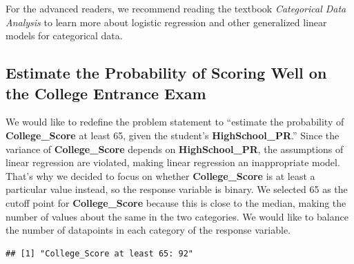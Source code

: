 \documentclass[
]{article}
\newenvironment{Shaded}{\begin{snugshade}}{\end{snugshade}}
\newcommand{\DecValTok}[1]{\textcolor[rgb]{0.00,0.00,0.81}{#1}}
\newcommand{\FunctionTok}[1]{\textcolor[rgb]{0.00,0.00,0.00}{#1}}
\newcommand{\NormalTok}[1]{#1}
\newcommand{\SpecialCharTok}[1]{\textcolor[rgb]{0.00,0.00,0.00}{#1}}
\newcommand{\StringTok}[1]{\textcolor[rgb]{0.31,0.60,0.02}{#1}}
\begin{document}
For the advanced readers, we recommend reading the textbook
\emph{Categorical Data Analysis} \citep{agresti2003categorical} to learn
more about logistic regression and other generalized linear models for
categorical data.

\hypertarget{threshold-65}{%
\subsection{Estimate the Probability of Scoring Well on the College
Entrance Exam}\label{threshold-65}}

We would like to redefine the problem statement to ``estimate the
probability of \textbf{College\_Score} at least 65, given the student's
\textbf{HighSchool\_PR}.'' Since the variance of \textbf{College\_Score}
depends on \textbf{HighSchool\_PR}, the assumptions of linear regression
are violated, making linear regression an inappropriate model. That's
why we decided to focus on whether \textbf{College\_Score} is at least a
particular value instead, so the response variable is binary. We
selected 65 as the cutoff point for \textbf{College\_Score} because this
is close to the median, making the number of values about the same in
the two categories. We would like to balance the number of datapoints in
each category of the response variable.

\begin{Shaded}
\end{Shaded}

\begin{verbatim}
## [1] "College_Score at least 65: 92"
\end{verbatim}

\begin{Shaded}
\end{Shaded}
\end{document}
